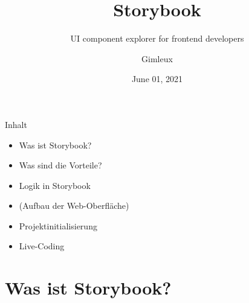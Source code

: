 \documentclass{beamer}
\title{Storybook}
\subtitle{UI component explorer for frontend developers}
\author{Gimleux}
\institute{Software Engineering}
\date{June 01, 2021}
\begin{document}

\begin{frame}
	\maketitle %
\end{frame}

\begin{frame}{Inhalt}
	\begin{itemize}
		\item Was ist Storybook?
		\item Was sind die Vorteile?
		\item Logik in Storybook
		\item (Aufbau der Web-Oberfläche)
		\item Projektinitialisierung
		\item Live-Coding
	\end{itemize}
\end{frame}


\section{Was ist Storybook?} %
\end{document}
